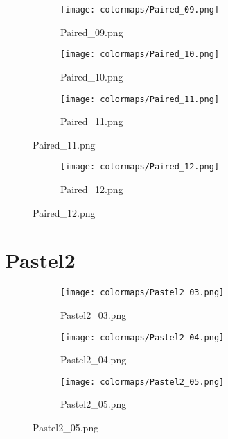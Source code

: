 \documentclass{article}%
\begin{document}
%
\hspace{1cm}\hfill%
\hspace{1cm}\hfill%
\hspace{1cm}\hfill%


\begin{figure}[h!]%
\begin{subfigure}[b]{0.3\linewidth}%
\texttt{[image: colormaps/Paired\_09.png]}%
\caption{Paired\_09.png}%
\end{subfigure}%
\begin{subfigure}[b]{0.3\linewidth}%
\texttt{[image: colormaps/Paired\_10.png]}%
\caption{Paired\_10.png}%
\end{subfigure}%
\begin{subfigure}[b]{0.3\linewidth}%
\texttt{[image: colormaps/Paired\_11.png]}%
\caption{Paired\_11.png}%
\end{subfigure}%
\end{figure}

%
\hspace{1cm}\hfill%


\begin{figure}[h!]%
\begin{subfigure}[b]{0.3\linewidth}%
\texttt{[image: colormaps/Paired\_12.png]}%
\caption{Paired\_12.png}%
\end{subfigure}%
\end{figure}

%
\newpage%
\section{Pastel2}%
\label{sec:Pastel2}%
\hspace{1cm}\hfill%
\hspace{1cm}\hfill%
\hspace{1cm}\hfill%


\begin{figure}[h!]%
\begin{subfigure}[b]{0.3\linewidth}%
\texttt{[image: colormaps/Pastel2\_03.png]}%
\caption{Pastel2\_03.png}%
\end{subfigure}%
\begin{subfigure}[b]{0.3\linewidth}%
\texttt{[image: colormaps/Pastel2\_04.png]}%
\caption{Pastel2\_04.png}%
\end{subfigure}%
\begin{subfigure}[b]{0.3\linewidth}%
\texttt{[image: colormaps/Pastel2\_05.png]}%
\caption{Pastel2\_05.png}%
\end{subfigure}%
\end{figure}
\end{document}
